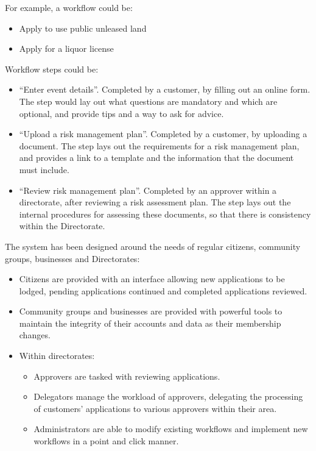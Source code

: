 \documentclass[12pt,a4paper,twosided]{article}
\begin{document}
\begin{framed}
For example, a workflow could be:

\begin{itemize}

\item
  Apply to use public unleased land
\item
  Apply for a liquor license
\end{itemize}

Workflow steps could be:

\begin{itemize}

\item
  ``Enter event details''. Completed by a customer, by filling out an
  online form. The step would lay out what questions are mandatory and
  which are optional, and provide tips and a way to ask for advice.
\item
  ``Upload a risk management plan''. Completed by a customer, by
  uploading a document. The step lays out the requirements for a risk
  management plan, and provides a link to a template and the information
  that the document must include.
\item
  ``Review risk management plan''. Completed by an approver within a
  directorate, after reviewing a risk assessment plan. The step lays out
  the internal procedures for assessing these documents, so that there
  is consistency within the Directorate.
\end{itemize}
\end{framed}

The system has been designed around the needs of regular citizens,
community groups, businesses and Directorates:

\begin{itemize}

\item
  Citizens are provided with an interface allowing new applications to
  be lodged, pending applications continued and completed applications
  reviewed.
\item
  Community groups and businesses are provided with powerful tools to
  maintain the integrity of their accounts and data as their membership
  changes.
\item
  Within directorates:
\begin{itemize}
\item
  Approvers are tasked with reviewing applications.
\item
  Delegators manage the workload of approvers, delegating the processing
  of customers' applications to various approvers within their area.
\item
  Administrators are able to modify existing workflows and implement new
  workflows in a point and click manner.
\end{itemize}
\end{itemize}
\end{document}
